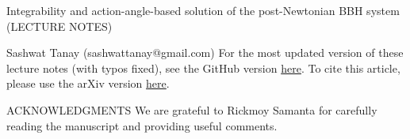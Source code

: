 \documentclass[12pt]{report}
\begin{document}
\begin{titlepage}


\begin{center}
{\Large Integrability and action-angle-based solution of the post-Newtonian BBH system}\\
(LECTURE NOTES)\\
\end{center}
\begin{center}
Sashwat Tanay (sashwattanay@gmail.com)
\linebreak
\linebreak
\linebreak
\linebreak
\linebreak
For the most updated version of these lecture notes (with typos fixed), 
see the GitHub version \href{https://github.com/sashwattanay/lectures_integrability_action-angles_PN_BBH/blob/gh-action-result/pdflatex/lecture_notes/main.pdf}{here}.
To cite this article, please use the arXiv version 
\href{arXiv version}{here}.
\end{center}
\newpage
\begin{center}
{\Large ACKNOWLEDGMENTS}
\linebreak
\linebreak
We are grateful to Rickmoy Samanta for carefully reading the manuscript
and providing useful comments.
\end{center}
\end{titlepage}



\tableofcontents















\end{document}
